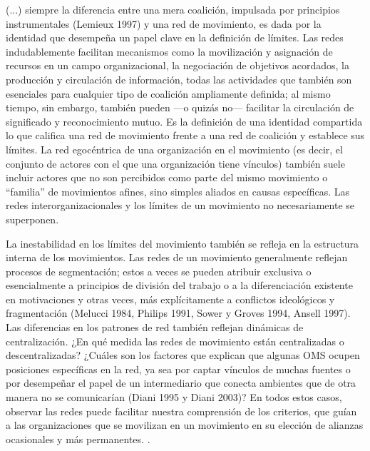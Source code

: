 \documentclass[letterpaper, 11pt]{book}
\theoremstyle{definition}
\theoremstyle{remark}
\begin{document}
\begin{center}
    \begin{minipage}{0.9\linewidth}
        {\setlength{\parindent}{12pt}\small
        (...) siempre la diferencia entre una mera coalición, impulsada por principios instrumentales (Lemieux 1997) y una red de movimiento, es dada por la identidad que desempeña un papel clave en la definición de límites. 
        Las redes indudablemente facilitan mecanismos como la movilización y asignación de recursos en un campo organizacional, la negociación de objetivos acordados, la producción y circulación de información, todas las actividades que también son esenciales para cualquier tipo de coalición ampliamente definida; al mismo tiempo, sin embargo, también pueden ---o quizás no--- facilitar la circulación de significado y reconocimiento mutuo. 
        Es la definición de una identidad compartida lo que califica una red de movimiento frente a una red de coalición y establece sus límites. 
        La red egocéntrica de una organización en el movimiento (es decir, el conjunto de actores con el que una organización tiene vínculos) también suele incluir actores que no son percibidos como parte del mismo movimiento o ``familia'' de movimientos afines, sino simples aliados en causas específicas. 
        Las redes interorganizacionales y los límites de un movimiento no necesariamente se superponen. 
        }
    \end{minipage}
    \begin{minipage}{0.9\linewidth}
        {\setlength{\parindent}{12pt}\small
        La inestabilidad en los límites del movimiento también se refleja en la estructura interna de los movimientos. 
        Las redes de un movimiento generalmente reflejan procesos de segmentación; estos a veces se pueden atribuir exclusiva o esencialmente a principios de división del trabajo o a la diferenciación existente en motivaciones y otras veces, más explícitamente a conflictos ideológicos y fragmentación (Melucci 1984, Philips 1991, Sower y Groves 1994, Ansell 1997). 
        Las diferencias en los patrones de red también reflejan dinámicas de centralización. 
        ¿En qué medida las redes de movimiento están centralizadas o descentralizadas? ¿Cuáles son los factores que explican que algunas OMS ocupen posiciones específicas en la red, ya sea por captar vínculos de muchas fuentes o por desempeñar el papel de un intermediario que conecta ambientes que de otra manera no se comunicarían (Diani 1995 y Diani 2003)? 
        En todos estos casos, observar las redes puede facilitar nuestra comprensión de los criterios, que guían a las organizaciones que se movilizan en un movimiento en su elección de alianzas ocasionales y más permanentes. 
        \normalsize \citep[10--11]{2003_Diani_SocialNetworks}.
        }
    \end{minipage}
\end{center}
\end{document}
